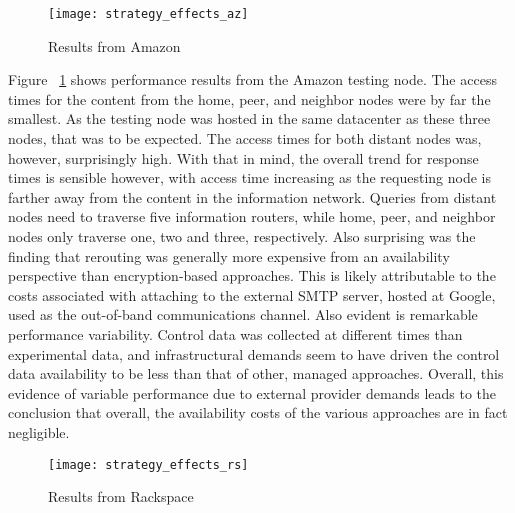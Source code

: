 \begin{figure}[!t]
\centering
\texttt{[image: strategy\_effects\_az]}
\caption{Results from Amazon}
\label{fig:model:amazon-results}
\end{figure}

Figure ~\ref{fig:model:amazon-results} shows performance results from the Amazon testing node.  The access times for the content from the home, peer, and neighbor nodes were by far the smallest.  As the testing node was hosted in the same datacenter as these three nodes, that was to be expected.  The access times for both distant nodes was, however, surprisingly high.  With that in mind, the overall trend for response times is sensible however, with access time increasing as the requesting node is farther away from the content in the information network.  Queries from distant nodes need to traverse five information routers, while home, peer, and neighbor nodes only traverse one, two and three, respectively.  Also surprising was the finding that rerouting was generally more expensive from an availability perspective than encryption-based approaches.  This is likely attributable to the costs associated with attaching to the external SMTP server, hosted at Google, used as the out-of-band communications channel.  Also evident is remarkable performance variability.  Control data was collected at different times than experimental data, and infrastructural demands seem to have driven the control data availability to be less than that of other, managed approaches.  Overall, this evidence of variable performance due to external provider demands leads to the conclusion that overall, the availability costs of the various approaches are in fact negligible.

\begin{figure}[!t]
\centering
\texttt{[image: strategy\_effects\_rs]}
\caption{Results from Rackspace}
\label{fig:model:rackspace-results}
\end{figure}

